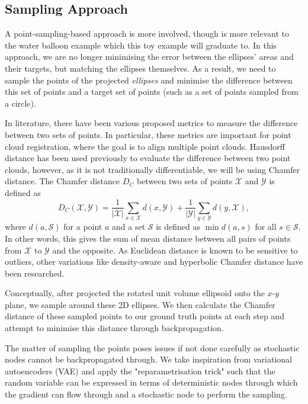 \documentclass{article}
\begin{document}
\subsection{Sampling Approach}
A point-sampling-based approach is more involved, though is more relevant to the water balloon example which this toy example will graduate to. In this approach, we are no longer minimising the error between the ellipses' areas and their targets, but matching the ellipses themselves. As a result, we need to sample the points of the projected \textit{ellipses} and minimise the difference between this set of points and a target set of points (such as a set of points sampled from a circle).

In literature, there have been various proposed metrics to measure the difference between two sets of points. In particular, these metrics are important for point cloud registration, where the goal is to align multiple point clouds. Hausdorff distance has been used previously to evaluate the difference between two point clouds, however, as it is not traditionally differentiable, we will be using Chamfer distance. The Chamfer distance $D_C$ between two sets of points $\mathcal{X}$ and $\mathcal{Y}$ is defined as 
\begin{equation}
    D_C(\mathcal{X,Y})= \frac{1}{|\mathcal{X}|}\sum_{x \in \mathcal{X}} d(x, \mathcal Y) + \frac{1}{|\mathcal{Y}|}\sum_{y \in \mathcal{Y}} d(y, \mathcal X),
\end{equation}
where $d(a, \mathcal S)$ for a point $a$ and a set $\mathcal S$ is defined as $\min d(a,s)$ for all $s \in \mathcal S$. In other words, this gives the sum of mean distance between all pairs of points from $\mathcal X$ to $\mathcal Y$ and the opposite. As Euclidean distance is known to be sensitive to outliers, other variations like density-aware and hyperbolic Chamfer distance have been researched. 

Conceptually, after projected the rotated unit volume ellipsoid onto the $x$-$y$ plane, we sample around these 2D ellipses. We then calculate the Chamfer distance of these sampled points to our ground truth points at each step and attempt to minimise this distance through backpropagation.

The matter of sampling the points poses issues if not done carefully as stochastic nodes cannot be backpropagated through. We take inspiration from variational autoencoders (VAE) and apply the "reparametrisation trick" such that the random variable can be expressed in terms of deterministic nodes through which the gradient can flow through and a stochastic node to perform the sampling.
\end{document}
